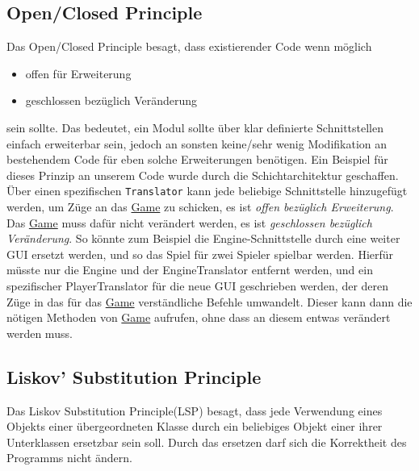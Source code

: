 \documentclass[
10pt, %
a4paper, %
oneside, %
headinclude,footinclude, %
BCOR5mm, %
]{scrartcl}
\begin{document}
\begin{onehalfspace}
\subsection{Open/Closed Principle}
Das Open/Closed Principle besagt, dass existierender Code wenn möglich
\begin{itemize}
	\item offen für Erweiterung
	\item geschlossen bezüglich Veränderung
\end{itemize}
sein sollte.
Das bedeutet, ein Modul sollte über klar definierte Schnittstellen einfach erweiterbar sein, jedoch an sonsten keine/sehr wenig Modifikation an bestehendem Code für eben solche Erweiterungen benötigen.
Ein Beispiel für dieses Prinzip an unserem Code wurde durch die Schichtarchitektur geschaffen. Über einen spezifischen \texttt{Translator} kann jede beliebige Schnittstelle hinzugefügt werden, um Züge an das \href{https://github.com/schmida736/Chess-AdvancedSE/blob/main/Chess-AdvancedSE/Game\%20Elements/Game.cs}{Game} zu schicken, es ist \textsl{offen bezüglich Erweiterung}. Das \href{https://github.com/schmida736/Chess-AdvancedSE/blob/main/Chess-AdvancedSE/Game\%20Elements/Game.cs}{Game} muss dafür nicht verändert werden, es ist \textsl{geschlossen bezüglich Veränderung}. So könnte zum Beispiel die Engine-Schnittstelle durch eine weiter GUI ersetzt werden, und so das Spiel für zwei Spieler spielbar werden. Hierfür müsste nur die Engine und der EngineTranslator entfernt werden, und ein spezifischer PlayerTranslator für die neue GUI geschrieben werden, der deren Züge in das für das \href{https://github.com/schmida736/Chess-AdvancedSE/blob/main/Chess-AdvancedSE/Game\%20Elements/Game.cs}{Game} verständliche Befehle umwandelt. Dieser kann dann die nötigen Methoden von \href{https://github.com/schmida736/Chess-AdvancedSE/blob/main/Chess-AdvancedSE/Game\%20Elements/Game.cs}{Game} aufrufen, ohne dass an diesem entwas verändert werden muss.
\subsection{Liskov' Substitution Principle}
Das Liskov Substitution Principle(LSP) besagt, dass jede Verwendung eines Objekts einer übergeordneten Klasse durch ein beliebiges Objekt einer ihrer Unterklassen ersetzbar sein soll. Durch das ersetzen darf sich die Korrektheit des Programms nicht ändern.


\end{onehalfspace}
\end{document}
